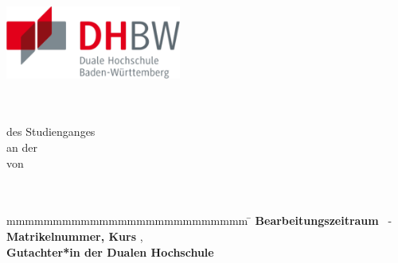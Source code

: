 \begin{titlepage}
    

    \includegraphics[height=2.4cm, left]{images/dhbw.pdf}

    \bigskip
    \begin{center}
        \vspace*{12mm} 
        \begin{center}
        \Large\textbf{\projectTitle}\par
        \end{center}
        \vspace*{24mm}  {\large\textbf{\projectType}}\\
                        {\large\textbf{\projectName}}\\
        \vspace*{12mm} des Studienganges \studiengang\\ an der \school\\
        \vspace*{12mm} von\\
        \vspace*{0mm} {\large\textbf{\autor}}\\
        
        
        \vspace*{12mm} \lastDateFormat\\
    \end{center}
    \vfill
    
    \begin{tabbing}
        mmmmmmmmmmmmmmmmmmmmmmmmmm \= \kill
        \textbf{Bearbeitungszeitraum} \> \startDate \ - \lastDate\\
        \textbf{Matrikelnummer, Kurs} \> \martrikelnr, \course\\
        \textbf{Gutachter*in der Dualen Hochschule} \> \supervisorSchool\\
    \end{tabbing}
\end{titlepage}